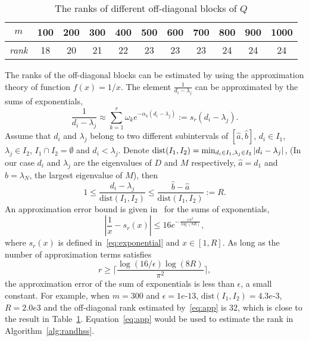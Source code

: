\documentclass[times]{nlaauth}
\begin{document}
\begin{table}[ptbh]
\caption{The ranks of different off-diagonal blocks of $Q$}
\label{tab:Ex1-rank}
\begin{center}
\begin{tabular}[c]{|c|cccccccccc|} \hline
$m$ & 100 & 200 & 300 & 400 & 500 & 600 & 700 & 800 & 900 & 1000 \\ \hline
\emph{rank} & 18 & 20 & 21 & 22 & 23 & 23 & 23 & 24 & 24 & 24  \\ \hline
\end{tabular}
\end{center}
\end{table}

The ranks of the off-diagonal blocks can be estimated by using the
approximation theory of function $f(x)=1/x$.
The element $\frac{1}{d_i-\lambda_j}$ can be approximated by the sums of exponentials,
\begin{equation}
\label{eq:exponential}
\frac{1}{d_i - \lambda_j} \approx \sum_{k=1}^r \omega_k e^{-\alpha_k (d_i-\lambda_j)}:=s_r(d_i-\lambda_j).
\end{equation}
Assume that $d_i$ and $\lambda_j$ belong to two different subintervals of $[\hat{a}, \hat{b}]$, $d_i \in I_1$, $\lambda_j \in I_2$, $I_1 \cap I_2=\emptyset$ and $d_i <\lambda _j$.
Denote $\mbox{dist}(I_1,I_2)=\min_{d_i\in I_1, \\ \lambda_j \in I_2} |d_i-\lambda_j|$, (In our case $d_i$ and $\lambda_j$
are the eigenvalues of $D$ and $M$ respectively, $\hat{a}=d_1$ and $\hat{b}=\lambda_N$, the largest eigenvalue of $M$), then
\begin{equation}
\label{eq:dist_xy}
1\leq \frac{d_i-\lambda_j}{\mbox{dist}(I_1,I_2)} \le \frac{\hat{b}-\hat{a}}{\mbox{dist}(I_1,I_2)}:=R.
\end{equation}
An approximation error bound is given in~\cite{hackbusch-exp} for the sums of exponentials,
\begin{equation}
\label{eq:app}
\left| \frac{1}{x}-s_r(x) \right| \leq 16 e^{-\frac{r\pi^2}{\log(8R)}},
\end{equation}
where $s_r(x)$ is defined in~\eqref{eq:exponential} and $x\in [1, R]$.
As long as the number of approximation terms satisfies
\begin{equation}
\label{eq:bounds}
r \ge \lceil \frac{\log(16/\epsilon) \log(8R)}{\pi^2} \rceil,
\end{equation}
the approximation error of the sum of exponentials is less than $\epsilon$, a small constant.
For example, when $m=300$ and $\epsilon=1e$-$13$, $\mbox{dist}(I_1,I_2)=4.3e$-$3$, $R=2.0e3$ and
the off-diagonal rank estimated by~\eqref{eq:app} is 32, which is close to the result in
Table~\ref{tab:Ex1-rank}.
Equation~\eqref{eq:app} would be used to estimate the rank in Algorithm~\ref{alg:randhss}.
\end{document}
